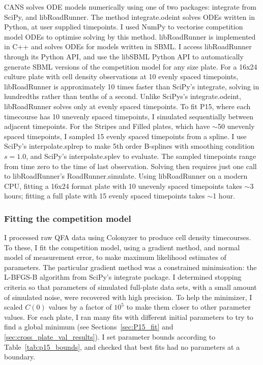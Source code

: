 CANS solves ODE models numerically using one of two packages:
integrate from SciPy, and libRoadRunner. The method integrate.odeint
solves ODEs written in Python, at user supplied timepoints. I used
NumPy to vectorise competition model ODEs to optimise solving by this
method. libRoadRunner is implemented in C++ and solves ODEs for models
written in SBML. I access libRoadRunner through its Python API, and
use the libSBML Python API to automatically generate SBML versions of
the competition model for any size plate. For a 16x24 culture plate
with cell density observations at 10 evenly spaced timepoints,
libRoadRunner is approximately 10 times faster than SciPy's integrate,
solving in hundredths rather than tenths of a second. Unlike SciPys's
integrate.odeint, libRoadRunner solves only at evenly spaced
timepoints. To fit P15, where each timecourse has 10 unevenly spaced
timepoints, I simulated sequentially between adjacent timepoints. For
the Stripes and Filled plates, which have \(\sim\)50 unevenly spaced
timepoints, I sampled 15 evenly spaced timepoints from a spline. I use
SciPy's interpolate.splrep to make 5th order B-splines with smoothing
condition \(s=1.0\), and SciPy's interpolate.splev to evaluate. The
sampled timepoints range from time zero to the time of last
observation. Solving then requires just one call to libRoadRunner's
RoadRunner.simulate. Using libRoadRunner on a modern CPU, fitting a
16x24 format plate with 10 unevenly spaced timepoints takes \(\sim\)3
hours; fitting a full plate with 15 evenly spaced timepoints takes
\(\sim\)1 hour.

\subsubsection{Fitting the competition model}
\label{sec:fitting_comp}

I processed raw QFA data using Colonyzer \citep{Lawless2010} to
produce cell density timecourses.
To these, I fit the competition model, using a gradient method, and
normal model of measurement error, to make maximum likelihood
estimates of parameters. The particular gradient method was a
constrained minimisation: the L-BFGS-B algorithm from SciPy's
integrate package. I determined stopping criteria so that parameters
of simulated full-plate data sets, with a small amount of simulated
noise, were recovered with high precision. To help the minimizer, I
scaled \(C(0)\) values by a factor of \(10^{5}\) to make them closer
to other parameter values. For each plate, I ran many fits with
different initial parameters to try to find a global minimum (see
Sections~\ref{sec:P15_fit} and \ref{sec:cross_plate_val_results}). I
set parameter bounds according to Table~\ref{tab:p15_bounds}, and
checked that best fits had no parameters at a boundary.

